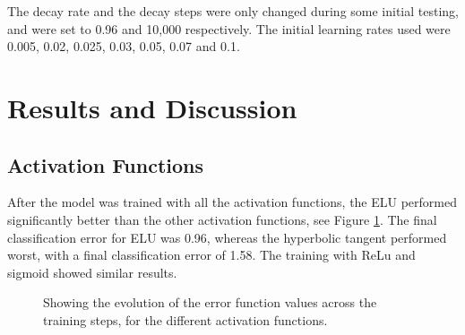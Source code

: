 \documentclass[]{article}
\begin{document}
The decay rate and the decay steps were only changed during some initial testing, and were set to 0.96 and 10,000 respectively. The initial learning rates used were 0.005, 0.02, 0.025, 0.03, 0.05, 0.07 and 0.1. 

\section{Results and Discussion}

\subsection{Activation Functions}

After the model was trained with all the activation functions, the ELU performed significantly better than the other activation functions, see Figure \ref{res-activ}. The final classification error for ELU was 0.96, whereas the hyperbolic tangent performed worst, with a final classification error of 1.58. The training with ReLu and sigmoid showed similar results. 


\begin{figure}[h]
	\centering
	
	\caption{Showing the evolution of the error function values across the training steps, for the different activation functions.}
	\label{res-activ}
\end{figure}
\end{document}
